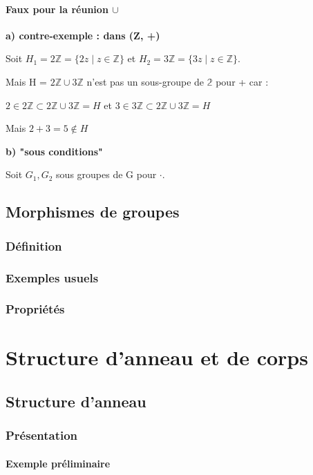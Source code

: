 \documentclass[12pt,a4paper,french]{book}
\begin{document}
\begin{spacing}{1.0}
			\subsubsection{Faux pour la réunion $\cup$}
			\textbf{a) contre-exemple : dans (Z, +)}
			
			Soit \(H_1 = 2\mathbb{Z} = \{ 2z \mid z \in \mathbb{Z} \}\) et \(H_2 = 3\mathbb{Z} = \{ 3z \mid z \in \mathbb{Z} \}\). 
			
			Mais H = \(2\mathbb{Z} \cup 3\mathbb{Z}\) n'est pas un sous-groupe de \(\mathbb{2}\) pour + car :
			
			\(2 \in 2\mathbb{Z} \subset 2\mathbb{Z} \cup 3\mathbb{Z} = H\) et \(3 \in 3\mathbb{Z} \subset 2\mathbb{Z} \cup 3\mathbb{Z} = H\)
			
			Mais \(2+3 = 5 \notin H\)
			
			\textbf{b) "sous conditions"}
			
			Soit \(G_1, G_2\) sous groupes de G pour \(\cdot\).
			
	\section{Morphismes de groupes}
	
		\subsection{Définition}
		\subsection{Exemples usuels}
		\subsection{Propriétés}
		
		
\chapter{Structure d'anneau et de corps}
	\section{Structure d'anneau}
		\subsection{Présentation}
			\subsubsection{Exemple préliminaire}

\end{spacing}
\end{document}
